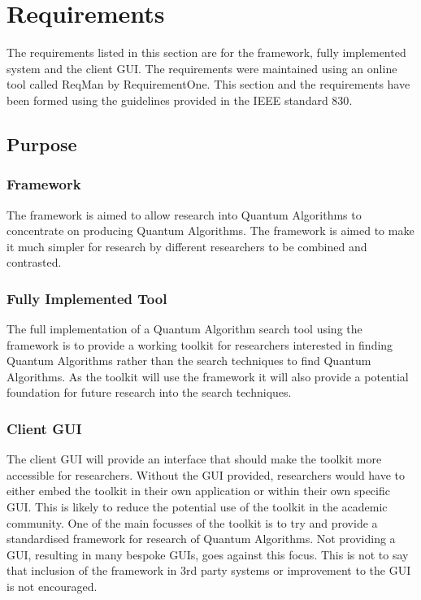 \chapter{Requirements}
The requirements listed in this section are for the framework, fully implemented system and the client GUI.
The requirements were maintained using an online tool called ReqMan\cite{reqman} by RequirementOne.
This section and the requirements have been formed using the guidelines provided in the IEEE standard 830\cite{ieee830}.

\section{Purpose}
\subsection{Framework}
The framework is aimed to allow research into Quantum Algorithms to concentrate on producing Quantum Algorithms.
The framework is aimed to make it much simpler for research by different researchers to be combined and contrasted.

\subsection{Fully Implemented Tool}
The full implementation of a Quantum Algorithm search tool using the framework is to provide a working toolkit for researchers interested in finding Quantum Algorithms rather than the search techniques to find Quantum Algorithms.
As the toolkit will use the framework it will also provide a potential foundation for future research into the search techniques.

\subsection{Client GUI}
The client GUI will provide an interface that should make the toolkit more accessible for researchers.
Without the GUI provided, researchers would have to either embed the toolkit in their own application or within their own specific GUI.
This is likely to reduce the potential use of the toolkit in the academic community.
One of the main focusses of the toolkit is to try and provide a standardised framework for research of Quantum Algorithms.
Not providing a GUI, resulting in many bespoke GUIs, goes against this focus.
This is not to say that inclusion of the framework in 3rd party systems or improvement to the GUI is not encouraged.

